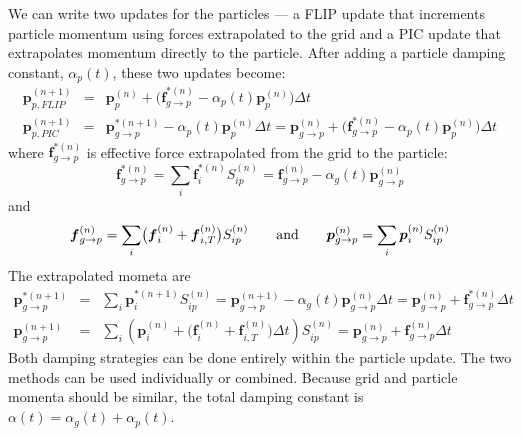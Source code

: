 \documentclass[11pt]{article}
\renewcommand{\vec}[1]{\boldsymbol{#1}}
\begin{document}
We can write two updates for the particles --- a FLIP update that increments particle momentum using forces extrapolated to the grid and a PIC update that extrapolates momentum directly to the particle. After adding a particle damping constant, $\alpha_p(t)$, these two updates become:
\begin{eqnarray}
      \vec{p}_{p,FLIP}^{(n+1)}  & = & \vec{p}_p^{(n)} + \bigl(\vec{f}_{g\to p}^{*(n)}  -  \alpha_p(t)\vec{p}_p^{(n)} \bigr)\Delta t   \\
      \vec{p}_{p,PIC}^{(n+1)}  & = & \vec p_{g\to p}^{*(n+1)} - \alpha_p(t)\vec{p}_p^{(n)}\Delta t
           = \vec p_{g\to p}^{(n)} + \bigl(\vec{f}_{g\to p}^{*(n)}  -  \alpha_p(t)\vec{p}_p^{(n)}\bigr)\Delta t 
\end{eqnarray}
where $\vec{f}_{g\to p}^{*(n)}$ is effective force extrapolated from the grid to the particle:
\begin{equation}
    \vec{f}_{g\to p}^{*(n)} = \sum_i  \vec f_i^{*(n)} S_{ip}^{(n)} = \vec{f}_{g\to p}^{(n)} -  \alpha_g(t)\vec p_{g\to p}^{(n)}   
\end{equation}
and
\begin{equation}
    \vec{f}_{g\to p}^{(n)} = \sum_i \bigl(\vec f_i^{(n)} + \vec f_{i,T}^{(n)}\bigr) S_{ip}^{(n)}    
    \qquad {\rm and}\qquad \vec p_{g\to p}^{(n)} = \sum_i  \vec p_i^{(n)} S_{ip}^{(n)}
\end{equation}
The extrapolated mometa are
\begin{eqnarray}
      \vec p_{g\to p}^{*(n+1)} & = & \sum_i  \vec p_i^{*(n+1)} S_{ip}^{(n)}
       = \vec p_{g\to p}^{(n+1)} - \alpha_g(t)\vec p_{g\to p}^{(n)}\Delta t  = \vec p_{g\to p}^{(n)} + \vec{f}_{g\to p}^{*(n)}\Delta t  \\ 
       \vec p_{g\to p}^{(n+1)} & = & 
          \sum_i  \left(\vec p_i^{(n)} +\bigl(\vec f_{i}^{(n)} + \vec f_{i,T}^{(n)}\bigr)\Delta t\right) S_{ip}^{(n)} 
          = \vec p_{g\to p}^{(n)} + \vec{f}_{g\to p}^{(n)}\Delta t  \label{pvgpJump}
\end{eqnarray}
Both damping strategies can be done entirely within the particle update. The two methods can be used individually or combined. Because grid and particle momenta should be similar, the total damping constant is $\alpha(t)=\alpha_g(t)+\alpha_p(t)$.
\end{document}
